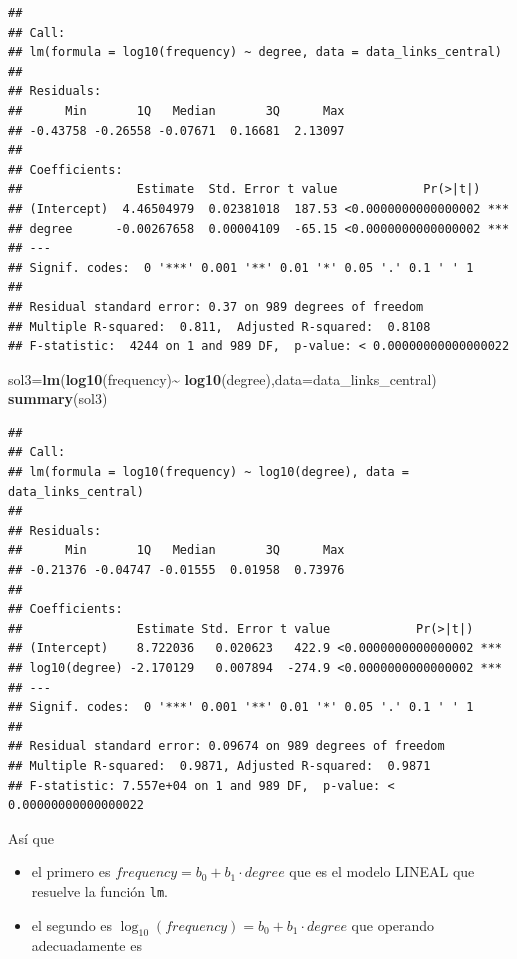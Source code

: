 \documentclass[
]{article}
\newenvironment{Shaded}{\begin{snugshade}}{\end{snugshade}}
\newcommand{\DataTypeTok}[1]{\textcolor[rgb]{0.13,0.29,0.53}{#1}}
\newcommand{\KeywordTok}[1]{\textcolor[rgb]{0.13,0.29,0.53}{\textbf{#1}}}
\newcommand{\NormalTok}[1]{#1}
\newcommand{\OperatorTok}[1]{\textcolor[rgb]{0.81,0.36,0.00}{\textbf{#1}}}
\newcommand{\StringTok}[1]{\textcolor[rgb]{0.31,0.60,0.02}{#1}}
\providecommand{\tightlist}{%
  \setlength{\itemsep}{0pt}\setlength{\parskip}{0pt}}
\begin{document}
\begin{verbatim}
## 
## Call:
## lm(formula = log10(frequency) ~ degree, data = data_links_central)
## 
## Residuals:
##      Min       1Q   Median       3Q      Max 
## -0.43758 -0.26558 -0.07671  0.16681  2.13097 
## 
## Coefficients:
##                Estimate  Std. Error t value            Pr(>|t|)    
## (Intercept)  4.46504979  0.02381018  187.53 <0.0000000000000002 ***
## degree      -0.00267658  0.00004109  -65.15 <0.0000000000000002 ***
## ---
## Signif. codes:  0 '***' 0.001 '**' 0.01 '*' 0.05 '.' 0.1 ' ' 1
## 
## Residual standard error: 0.37 on 989 degrees of freedom
## Multiple R-squared:  0.811,  Adjusted R-squared:  0.8108 
## F-statistic:  4244 on 1 and 989 DF,  p-value: < 0.00000000000000022
\end{verbatim}

\begin{Shaded}
\begin{Highlighting}[]
\NormalTok{sol3=}\KeywordTok{lm}\NormalTok{(}\KeywordTok{log10}\NormalTok{(frequency)}\OperatorTok{\textasciitilde{}}\StringTok{ }\KeywordTok{log10}\NormalTok{(degree),}\DataTypeTok{data=}\NormalTok{data\_links\_central)}
\KeywordTok{summary}\NormalTok{(sol3)}
\end{Highlighting}
\end{Shaded}

\begin{verbatim}
## 
## Call:
## lm(formula = log10(frequency) ~ log10(degree), data = data_links_central)
## 
## Residuals:
##      Min       1Q   Median       3Q      Max 
## -0.21376 -0.04747 -0.01555  0.01958  0.73976 
## 
## Coefficients:
##                Estimate Std. Error t value            Pr(>|t|)    
## (Intercept)    8.722036   0.020623   422.9 <0.0000000000000002 ***
## log10(degree) -2.170129   0.007894  -274.9 <0.0000000000000002 ***
## ---
## Signif. codes:  0 '***' 0.001 '**' 0.01 '*' 0.05 '.' 0.1 ' ' 1
## 
## Residual standard error: 0.09674 on 989 degrees of freedom
## Multiple R-squared:  0.9871, Adjusted R-squared:  0.9871 
## F-statistic: 7.557e+04 on 1 and 989 DF,  p-value: < 0.00000000000000022
\end{verbatim}

Así que

\begin{itemize}
\tightlist
\item
  el primero es \(frequency = b_0+b_1\cdot degree\) que es el modelo
  LINEAL que resuelve la función \texttt{lm}.
\item
  el segundo es \(\log_{10}(frequency) = b_0+b_1\cdot degree\) que
  operando adecuadamente es
\end{itemize}
\end{document}
